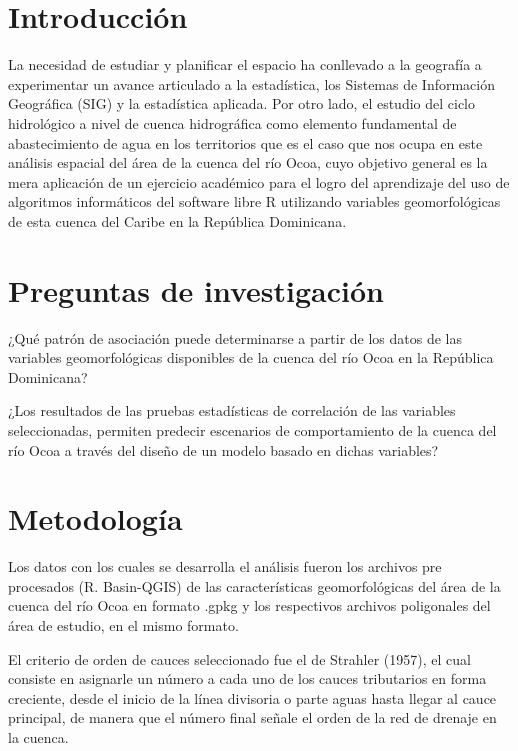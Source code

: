 \documentclass[11pt,]{article}
\begin{document}
\vskip 6.5pt


\noindent  \section{Introducción}\label{introducciuxf3n}

La necesidad de estudiar y planificar el espacio ha conllevado a la
geografía a experimentar un avance articulado a la estadística, los
Sistemas de Información Geográfica (SIG) y la estadística aplicada. Por
otro lado, el estudio del ciclo hidrológico a nivel de cuenca
hidrográfica como elemento fundamental de abastecimiento de agua en los
territorios que es el caso que nos ocupa en este análisis espacial del
área de la cuenca del río Ocoa, cuyo objetivo general es la mera
aplicación de un ejercicio académico para el logro del aprendizaje del
uso de algoritmos informáticos del software libre R utilizando variables
geomorfológicas de esta cuenca del Caribe en la República Dominicana.

\section{Preguntas de
investigación}\label{preguntas-de-investigaciuxf3n}

¿Qué patrón de asociación puede determinarse a partir de los datos de
las variables geomorfológicas disponibles de la cuenca del río Ocoa en
la República Dominicana?

¿Los resultados de las pruebas estadísticas de correlación de las
variables seleccionadas, permiten predecir escenarios de comportamiento
de la cuenca del río Ocoa a través del diseño de un modelo basado en
dichas variables?

\section{Metodología}\label{metodologuxeda}

Los datos con los cuales se desarrolla el análisis fueron los archivos
pre procesados (R. Basin-QGIS) de las características geomorfológicas
del área de la cuenca del río Ocoa en formato .gpkg y los respectivos
archivos poligonales del área de estudio, en el mismo formato.

El criterio de orden de cauces seleccionado fue el de Strahler (1957),
el cual consiste en asignarle un número a cada uno de los cauces
tributarios en forma creciente, desde el inicio de la línea divisoria o
parte aguas hasta llegar al cauce principal, de manera que el número
final señale el orden de la red de drenaje en la cuenca.
\end{document}
